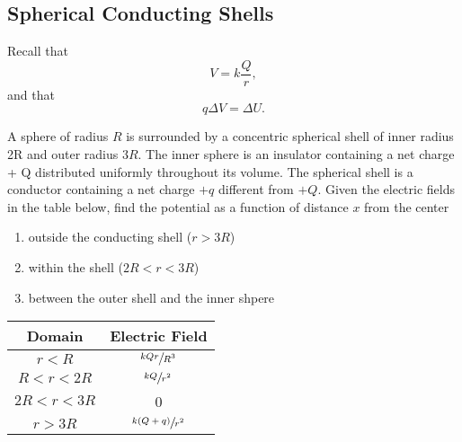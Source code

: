 \documentclass[11pt]{article}
\begin{document}
\subsection{Spherical Conducting Shells}
Recall that
\[V = k\frac{Q}{r},\]
and that
\[q\Delta V = \Delta U.\]
\begin{example}[AP 1990]
    A sphere of radius $R$ is surrounded by a concentric spherical shell of inner radius 2R and outer radius $3R$. The inner sphere is an insulator containing a net charge + Q distributed uniformly throughout its volume. The spherical shell is a conductor containing a net charge $+q$ different from $+Q$. Given the electric fields in the table below, find the potential as a function of distance $x$ from the center
    \begin{enumerate}[noitemsep , label=(\alph*)]
        \item outside the conducting shell ($r>3R$)
        \item within the shell ($2R < r < 3R$)
        \item between the outer shell and the inner shpere
    \end{enumerate}
\end{example}
\begin{table}[H]
    \centering
    \begin{tabular}{cc}
        \toprule
        Domain & Electric Field \\ \midrule
        $r < R$ & $\sfrac{kQr}{R^3}$ \\
        $R < r < 2R$ & $\sfrac{kQ}{r^2}$ \\
        $2R < r < 3R$ & 0 \\
        $r > 3R$ & $\sfrac{k(Q+q)}{r^2}$ \\ \bottomrule
    \end{tabular}    
\end{table}
\end{document}
